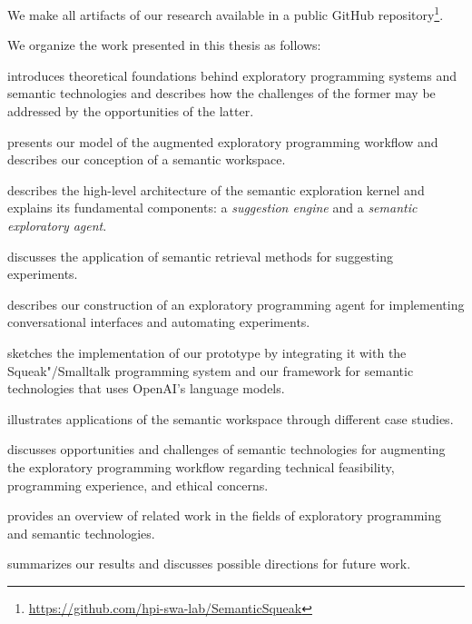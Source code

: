 We make all artifacts of our research available in a public GitHub repository\footnote{\url{https://github.com/hpi-swa-lab/SemanticSqueak}}. %

We organize the work presented in this thesis as follows:
%
\begin{description}[noextralabelsep]
	\item[\Cref{cha:background}] introduces theoretical foundations behind exploratory programming systems and semantic technologies and describes how the challenges of the former may be addressed by the opportunities of the latter.
	\item[\Cref{cha:approach}] presents our model of the augmented exploratory programming workflow and describes our conception of a semantic workspace.
	\item[\Cref{cha:design}] describes the high-level architecture of the semantic exploration kernel and explains its fundamental components: a \emph{suggestion engine} and a \emph{semantic exploratory agent}.
	\item[\Cref{cha:suggestions}] discusses the application of semantic retrieval methods for suggesting experiments.
	\item[\Cref{cha:agent}] describes our construction of an exploratory programming agent for implementing conversational interfaces and automating experiments. %
	\item[\Cref{cha:implementation}] sketches the implementation of our prototype by integrating it with the Squeak"/Smalltalk programming system and our \semtex framework for semantic technologies that uses OpenAI's language models.
	\item[\Cref{cha:application}] illustrates applications of the semantic workspace through dif\-fer\-ent case studies.
	\item[\Cref{cha:discussion}] discusses opportunities and challenges of semantic technologies for augmenting the exploratory programming workflow regarding technical feasibility, programming experience, and ethical concerns.
	\item[\Cref{cha:related_work}] provides an overview of related work in the fields of exploratory programming and semantic technologies.
	\item[\Cref{cha:conclusion}] summarizes our results and discusses possible directions for future work.
\end{description}

